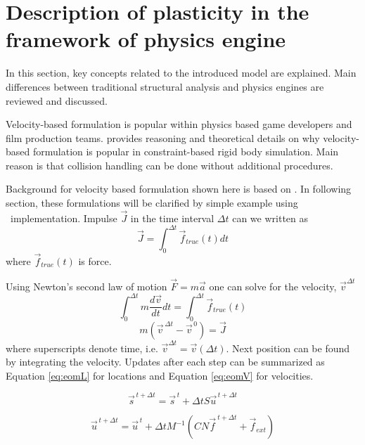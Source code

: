 \section{Description of plasticity in the framework of physics engine}

In this section, key concepts related to the introduced model are explained. Main differences between 
traditional structural analysis and physics engines are reviewed and discussed.

Velocity-based formulation is  popular within physics based game
developers and film production teams.
 \citet[p.~45]{erleben.thesis} provides reasoning and theoretical details on why 
velocity-based formulation is  popular in constraint-based rigid body simulation. 
Main reason is that collision handling can be done without additional procedures.

Background
for velocity based formulation shown here is based on  \citet[p.~45-50]{erleben.thesis}.
In following section, these formulations will be clarified by simple example using \bullet\ implementation.
Impulse $\vec{J}$
in the time interval $\Delta t $ can we written as
\begin{equation} \label{eq:impulseIntegral}
\vec{J} = \int_{0}^{\Delta t} \vec{f}_{true}(t) dt
\end{equation}
where $\vec{f}_{true}(t)$ is force.

Using Newton's second law of motion $\vec{F}=m\vec{a}$ one can solve for the velocity,
$\vec{v}^{\Delta t}$
\begin{equation} \label{eq:impulseIntegraWithNewton}
\int_{0}^{\Delta t} m \frac{d\vec{v}}{dt}dt= \int_{0}^{\Delta t} \vec{f}_{true}(t)
\end{equation}
\begin{equation} \label{eq:impulse}
m(\vec{v}^{\, \Delta t} - \vec{v}^{\, 0})=\vec{J}
\end{equation}
where superscripts denote time, i.e. ${\vec{v}}^{\Delta t}=\vec{v}(\Delta t)$.
Next position can be found
by integrating the velocity.
Updates after each step can be summarized as Equation
 \ref{eq:eomL} for locations and  Equation 
\ref{eq:eomV} for velocities. 

\begin{equation} \label{eq:eomL} %
\vec{s}^{\, t+\Delta t} = \vec{s}^{\, t}+\Delta t S \vec{u}^{\, t+\Delta t}
\end{equation}

\begin{equation} \label{eq:eomV}
\vec{u}^{\, t+\Delta t} = \vec{u}^{\, t}+\Delta t M^{-1}(C N \vec{f}^{\ t+\Delta t} + \vec{f}_{ext}) 
\end{equation}

